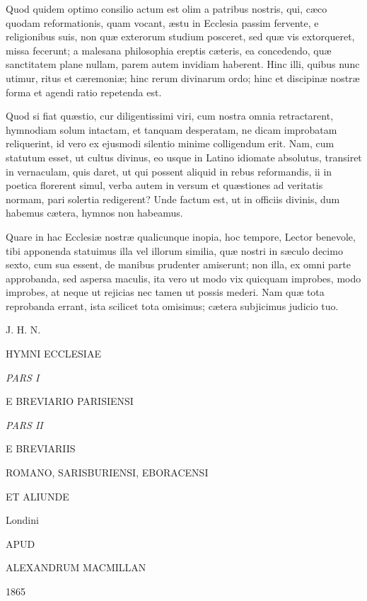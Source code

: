Quod quidem optimo consilio actum est olim a
patribus nostris, qui, cæco quodam reformationis, quam vocant,
æstu in Ecclesia passim fervente, e religionibus suis, non quæ
exterorum studium posceret, sed quæ vis extorqueret, missa fecerunt;
a malesana philosophia ereptis cæteris, ea concedendo, quæ
sanctitatem plane nullam, parem autem invidiam haberent. Hinc illi,
quibus nunc utimur, ritus et cæremoniæ; hinc rerum divinarum ordo;
hinc et discipinæ nostræ forma et agendi ratio repetenda est.

Quod si fiat quæstio, cur diligentissimi viri,
cum nostra omnia retractarent, hymnodiam solum intactam, et tanquam
desperatam, ne dicam improbatam reliquerint, id vero ex ejusmodi
silentio minime colligendum erit. Nam, cum statutum esset, ut cultus
divinus, eo usque in Latino idiomate absolutus, transiret in
vernaculam, quis daret, ut qui possent aliquid in rebus reformandis,
ii in poetica florerent simul, verba autem in versum et quæstiones ad
veritatis normam, pari solertia redigerent? Unde factum est, ut in
officiis divinis, dum habemus cætera, hymnos non habeamus.

Quare in hac Ecclesiæ nostræ qualicunque inopia,
hoc tempore, Lector benevole, tibi apponenda statuimus illa vel
illorum similia, quæ nostri in sæculo decimo sexto, cum sua essent,
de manibus prudenter amiserunt; non illa, ex omni parte
approbanda, sed aspersa maculis, ita vero ut modo vix quicquam
improbes, modo improbes, at neque ut rejicias nec tamen ut possis
mederi. Nam quæ tota reprobanda errant, ista scilicet tota omisimus;
cætera subjicimus judicio tuo.

J. H. N.


HYMNI ECCLESIAE

\emph{PARS I}

E
BREVIARIO PARISIENSI

\emph{PARS II}

E BREVIARIIS

ROMANO, SARISBURIENSI, EBORACENSI

ET ALIUNDE

Londini

APUD

ALEXANDRUM MACMILLAN

1865
